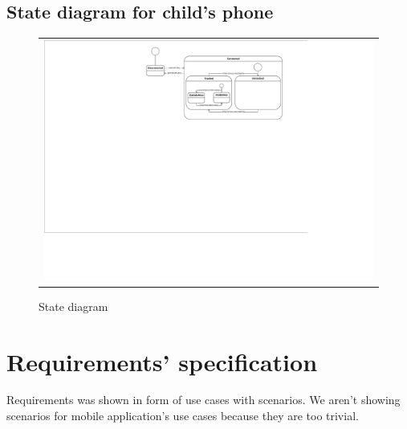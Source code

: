 \documentclass{sprawozdanie-agh}
\begin{document}
		\subsection{State diagram for child's phone}
		
		\begin{figure}[H]
			\centering
			\begin{tabular}{c}
				\includegraphics[width=.95\textwidth]{Stanu_cropped} 
			\end{tabular}
			\caption{State diagram}
		\end{figure}

	\section{Requirements' specification}
		
		Requirements was shown in form of use cases with scenarios. We aren't showing scenarios for mobile application's use cases because they are too trivial.
\end{document}
